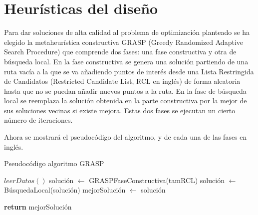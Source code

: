 \section[Heurísticas del diseño]{Heurísticas del diseño}
Para dar soluciones de alta calidad al problema de optimización planteado se ha elegido la metaheurística constructiva GRASP (Greedy Randomized Adaptive Search Procedure) que comprende dos fases: una fase constructiva y otra de búsqueda local. En la fase constructiva se genera una solución partiendo de una ruta vacía a la que se va añadiendo puntos de interés desde una Lista Restringida de Candidatos (Restricted Candidate List, RCL en inglés) de forma aleatoria hasta que no se puedan añadir nuevos puntos a la ruta. En la fase de búsqueda local se reemplaza la solución obtenida en la parte constructiva por la mejor de sus soluciones vecinas si existe mejora. Estas dos fases se ejecutan un cierto número de iteraciones.

Ahora se mostrará el pseudocódigo del algoritmo, y de cada una de las fases en inglés.
\vspace{0.06in}

\begin{algorithm}
	\caption{Pseudocódigo algoritmo GRASP}
	\label{alg:grasp}
\begin{algorithmic}
	\State $ leerDatos() $
		\State solución $ \gets $ GRASPFaseConstructiva(tamRCL)
		\State  solución $\gets$ BúsquedaLocal(solución)
			\State  mejorSolución $\gets$ solución
		\EndIf
	\EndFor
	
	\State \textbf{return} mejorSolución
	\EndFunction
\end{algorithmic}
\end{algorithm}

